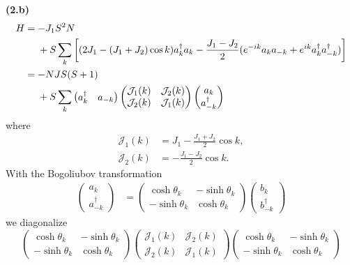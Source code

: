 \documentclass{article}
\makeatletter
\newcommand*{\shifttext}[1]{%
  \settowidth{\@tempdima}{#1}%
  \hspace{-\@tempdima}#1%
}
\newcommand{\plabel}[1]{%
\shifttext{\textbf{#1}\quad}%
}
\newcommand{\minusbaseline}{\abovedisplayskip=0pt\abovedisplayshortskip=0pt~\vspace*{-\baselineskip}}%
\makeatother
\begin{document}
\plabel{(2.b)}%
\begingroup\minusbaseline
\begin{align*}
    H &= -J_1 S^2 N \\
    &\phantom{{}={}} + S \sum_{k} \qty[(2J_1 - (J_1 + J_2) \cos k) a^\dagger_{k}a_k - \frac{J_1 - J_2}{2}(e^{-ik}a_{k}a_{-k} + e^{ik}a^\dagger_k a^\dagger_{-k})] \\
    &= - NJS(S+1) \\
    &\phantom{{}={}} + S\sum_k \begin{pmatrix}
        a^\dagger_k & a_{-k}
    \end{pmatrix} \begin{pmatrix}
        \mathcal{J}_1(k) & \mathcal{J}_2(k) \\
        \mathcal{J}_2(k) & \mathcal{J}_1(k)
    \end{pmatrix} \begin{pmatrix}
        a_k \\ a^\dagger_{-k}
    \end{pmatrix}
\end{align*}
\endgroup
where
\begin{align*}
    \mathcal{J}_1(k) &= J_1 - \frac{J_1+J_2}{2}\cos k, \\
    \mathcal{J}_2(k) &= - \frac{J_1 - J_2}{2} \cos k.
\end{align*}
With the Bogoliubov transformation
\begin{align*}
    \begin{pmatrix}
        a_k \\ a^\dagger_{-k}
    \end{pmatrix} &= \begin{pmatrix}
        \cosh \theta_k & -\sinh \theta_k \\
        -\sinh \theta_k & \cosh \theta_k
    \end{pmatrix} \begin{pmatrix}
        b_k \\ b^\dagger_{-k}
    \end{pmatrix}
\end{align*}
we diagonalize
\[ \begin{pmatrix}
    \cosh \theta_k & -\sinh \theta_k \\
    -\sinh \theta_k & \cosh \theta_k
\end{pmatrix} \begin{pmatrix}
    \mathcal{J}_1(k) & \mathcal{J}_2(k) \\
    \mathcal{J}_2(k) & \mathcal{J}_1(k)
\end{pmatrix} \begin{pmatrix}
    \cosh \theta_k & -\sinh \theta_k \\
    -\sinh \theta_k & \cosh \theta_k
\end{pmatrix} \]
\end{document}
